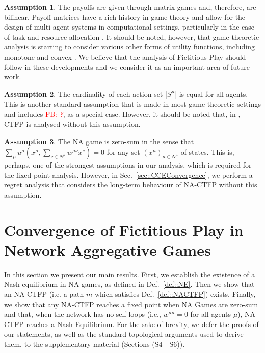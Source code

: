 \documentclass{article}
\theoremstyle{definition}
\newtheorem{assumption}{Assumption}
\newcommand{\fb}[1]{\textcolor{red}{FB: \textit{#1}}}
\newcommand{\actionset}[1]{S^{#1}}
\newcommand{\wmunu}{w^{\mu \nu}}
\newcommand{\xmu}{x^{\mu}}
\newcommand{\xnu}{x^{\nu}}
\newcommand{\weightedsum}{ \sum_{\nu \in N^\mu} \wmunu \xnu}
\begin{document}
  \begin{assumption}\label{ass::matrixgame}
    The payoffs are given through matrix games and, therefore, are
    bilinear. Payoff matrices have a rich history in game theory and
    allow for the design of multi-agent systems in computational
    settings, particularly in the case of task and resource allocation
    \cite{Nisan2007}. It should be noted, however, that game-theoretic
    analysis is starting to consider various other forms of utility
    functions, including monotone and convex \cite{Parise2020}. We
    believe that the analysis of Fictitious Play should follow in
    these developments and we consider it as an important area of
    future work.
  \end{assumption}

  \begin{assumption}\label{ass::sameactions}
    The cardinality of each action set $|\actionset{\mu}|$ is equal
    for all agents. This is another standard assumption that is made in
    most game-theoretic settings and includes \fb{?}, as a special
    case. However, it should be noted that, in \cite{Ewerhart2020},
    CTFP is analysed without this assumption.
  \end{assumption}

  \begin{assumption}\label{ass::zerosum}
    The NA game is zero-sum in the sense that $\sum_{\mu} u^\mu(\xmu,
    \weightedsum) = 0$ for any set $(x^\mu)_{\mu \in N^\mu}$ of
    states. This is, perhaps, one of the strongest assumptions in our
    analysis, which is required for the fixed-point analysis. However,
    in Sec.~\ref{sec::CCEConvergence}, we perform a regret analysis
    that considers the long-term behaviour of NA-CTFP without this
    assumption.
  \end{assumption}

\section{Convergence of Fictitious Play in Network Aggregative Games}
\label{sec::CTFPAnalysis}

  
  In this section we present our main results. First, we establish the
  existence of a Nash equilibrium in NA games, as defined in
  Def.~\ref{def::NE}. Then we show that an NA-CTFP (i.e. a path $m$ which satisfies Def.~\ref{def::NACTFP}) exists. Finally, we show that any NA-CTFP reaches a fixed point when
  NA Games are zero-sum and that, when the network has no self-loops
  (i.e., $w^{\mu \mu} = 0$ for all agents $\mu$), NA-CTFP reaches a Nash Equilibrium. For the sake
  of brevity, we defer the proofs of our statements, as well as the
  standard topological arguments used to derive them, to the
  supplementary material (Sections (S4 - S6)).
\end{document}
